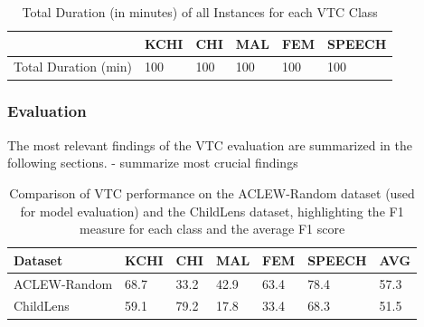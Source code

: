 \documentclass[
  man,floatsintext]{apa6}
\begin{document}
\begin{table}[tbp]

\begin{center}
\begin{threeparttable}

\caption{\label{tab:vtc-classes-statistics}Total Duration (in minutes) of all Instances for each VTC Class}

\begin{tabular}{llllll}
\toprule
 & \multicolumn{1}{c}{KCHI} & \multicolumn{1}{c}{CHI} & \multicolumn{1}{c}{MAL} & \multicolumn{1}{c}{FEM} & \multicolumn{1}{c}{SPEECH}\\
\midrule
Total Duration (min) & 100 & 100 & 100 & 100 & 100\\
\bottomrule
\end{tabular}

\end{threeparttable}
\end{center}

\end{table}

\subsubsection{Evaluation}\label{evaluation-1}

The most relevant findings of the VTC evaluation are summarized in the following sections.
- summarize most crucial findings

\begin{table}[tbp]

\begin{center}
\begin{threeparttable}

\caption{\label{tab:vtc-results}Comparison of VTC performance on the ACLEW-Random dataset (used for model evaluation) and the ChildLens dataset, highlighting the F1  measure for each class and the average F1 score}

\begin{tabular}{lllllll}
\toprule
Dataset & \multicolumn{1}{c}{KCHI} & \multicolumn{1}{c}{CHI} & \multicolumn{1}{c}{MAL} & \multicolumn{1}{c}{FEM} & \multicolumn{1}{c}{SPEECH} & \multicolumn{1}{c}{AVG}\\
\midrule
ACLEW-Random & 68.7 & 33.2 & 42.9 & 63.4 & 78.4 & 57.3\\
ChildLens & 59.1 & 79.2 & 17.8 & 33.4 & 68.3 & 51.5\\
\bottomrule
\end{tabular}

\end{threeparttable}
\end{center}

\end{table}
\end{document}
